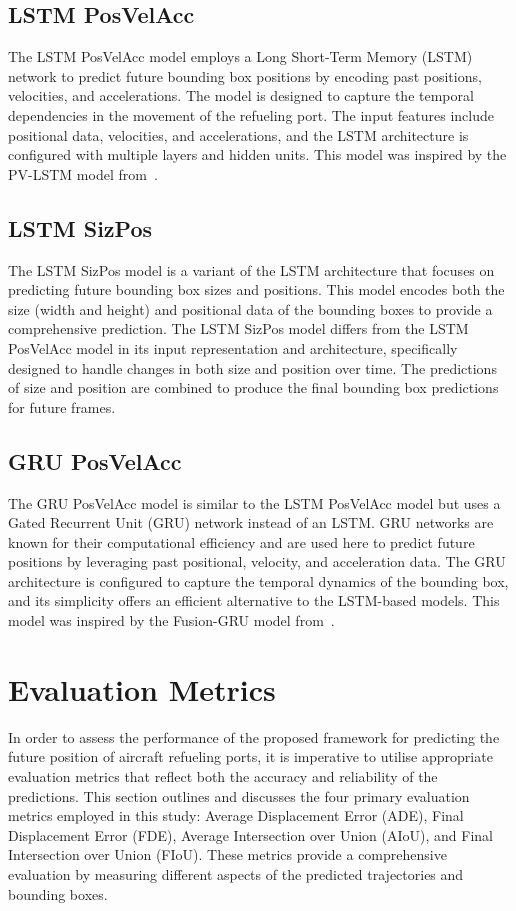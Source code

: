 \documentclass[12pt,oneside]{book} %
\begin{document}
\subsection*{LSTM PosVelAcc}
The LSTM PosVelAcc model employs a Long Short-Term Memory (LSTM) network to
predict future bounding box positions by encoding past positions, velocities,
and accelerations. The model is designed to capture the temporal dependencies
in the movement of the refueling port. The input features include positional
data, velocities, and accelerations, and the LSTM architecture is configured
with multiple layers and hidden units. This model was inspired by the PV-LSTM
model from~\citet{DBLP:journals/corr/abs-2010-10270}.

\subsection*{LSTM SizPos}
The LSTM SizPos model is a variant of the LSTM architecture that focuses on
predicting future bounding box sizes and positions. This model encodes both the
size (width and height) and positional data of the bounding boxes to provide a
comprehensive prediction. The LSTM SizPos model differs from the LSTM PosVelAcc
model in its input representation and architecture, specifically designed to
handle changes in both size and position over time. The predictions of size and
position are combined to produce the final bounding box predictions for future
frames.

\subsection*{GRU PosVelAcc}
The GRU PosVelAcc model is similar to the LSTM PosVelAcc model but uses a Gated
Recurrent Unit (GRU) network instead of an LSTM. GRU networks are known for
their computational efficiency and are used here to predict future positions by
leveraging past positional, velocity, and acceleration data. The GRU
architecture is configured to capture the temporal dynamics of the bounding
box, and its simplicity offers an efficient alternative to the LSTM-based
models. This model was inspired by the Fusion-GRU model from~\citet{FusionGRU}.

\section{Evaluation Metrics}
In order to assess the performance of the proposed framework for predicting the
future position of aircraft refueling ports, it is imperative to utilise
appropriate evaluation metrics that reflect both the accuracy and reliability
of the predictions. This section outlines and discusses the four primary
evaluation metrics employed in this study: Average Displacement Error (ADE),
Final Displacement Error (FDE), Average Intersection over Union (AIoU), and
Final Intersection over Union (FIoU). These metrics provide a comprehensive
evaluation by measuring different aspects of the predicted trajectories and
bounding boxes.
\end{document}
